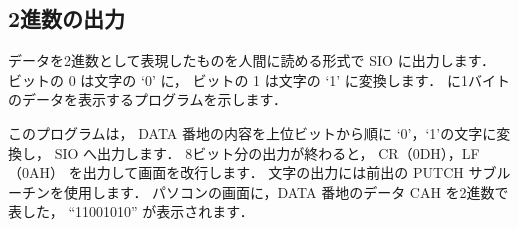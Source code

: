 \subsection{2進数の出力}

データを2進数として表現したものを人間に読める形式で SIO に出力します．
ビットの 0 は文字の `0' に，
ビットの 1 は文字の `1' に変換します．
に1バイトのデータを表示するプログラムを示します．

このプログラムは，
DATA 番地の内容を上位ビットから順に `0'，`1'の文字に変換し，
SIO へ出力します．
8ビット分の出力が終わると，
CR（0DH），LF（0AH） を出力して画面を改行します．
文字の出力には前出の PUTCH サブルーチンを使用します．
パソコンの画面に，DATA 番地のデータ CAH を2進数で表した，
``11001010'' が表示されます．

